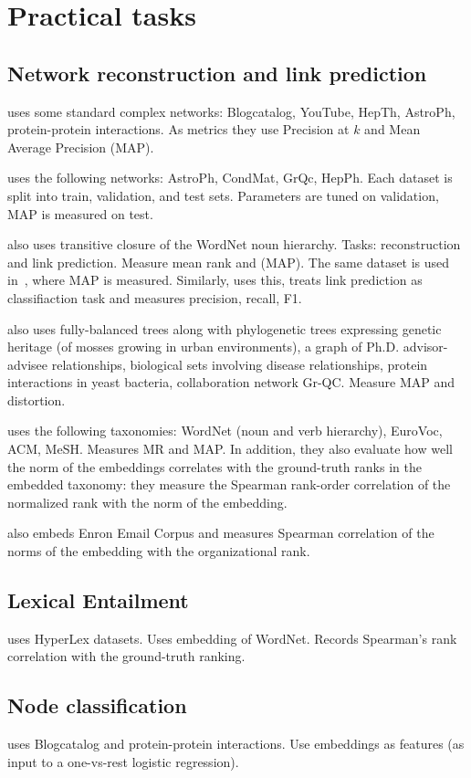 \documentclass{article}
\begin{document}
\section{Practical tasks}

\subsection{Network reconstruction and link prediction}

\cite{goyal2018graph} uses some standard complex networks: Blogcatalog, YouTube, HepTh, AstroPh, protein-protein interactions. As metrics they use Precision at $k$ and Mean Average Precision (MAP).

\cite{nickel2017poincare} uses the following networks: AstroPh, CondMat, GrQc, HepPh. Each dataset is split into train, validation, and test sets. Parameters are tuned on validation, MAP is measured on test. 

\cite{nickel2017poincare} also uses transitive closure of the WordNet noun hierarchy. Tasks: reconstruction and link prediction. Measure mean rank and (MAP).  The same dataset is used in~\cite{sala2018representation}, where MAP is measured. Similarly, \cite{ganea2018hyperbolic} uses this, treats link prediction as classifiaction task and measures precision, recall, F1.

\cite{sala2018representation} also uses fully-balanced trees along with phylogenetic trees expressing genetic heritage (of mosses growing in urban
environments), a graph of Ph.D. advisor-advisee relationships, biological sets involving disease relationships, protein interactions in yeast bacteria, collaboration network Gr-QC. Measure MAP and distortion. 

\cite{nickel2018learning} uses the following taxonomies: WordNet (noun and verb hierarchy), EuroVoc, ACM, MeSH. Measures MR and MAP. In addition, they also evaluate how well the norm of the embeddings  correlates with
the ground-truth ranks in the embedded taxonomy: they measure the Spearman rank-order correlation of the normalized rank with the norm of the embedding. 
 
\cite{nickel2018learning} also embeds Enron Email Corpus and measures Spearman correlation of the norms of the embedding with
the organizational rank.

 
\subsection{Lexical Entailment}

\cite{nickel2017poincare} uses HyperLex datasets. Uses embedding of WordNet. Records Spearman’s rank correlation
with the ground-truth ranking. 

\subsection{Node classification}

\cite{goyal2018graph} uses Blogcatalog and protein-protein interactions. Use embeddings as features (as input to a one-vs-rest logistic regression).
	




\end{document}
